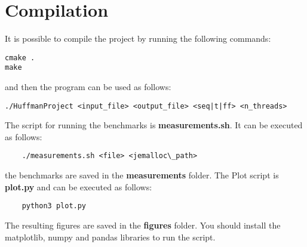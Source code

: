 \documentclass{article}
\begin{document}
\section{Compilation}
It is possible to compile the project by running the following commands:
\begin{verbatim}
cmake .
make
\end{verbatim}
and then the program can be used as follows:
\begin{verbatim}
./HuffmanProject <input_file> <output_file> <seq|t|ff> <n_threads>
\end{verbatim}
The script for running the benchmarks is \textbf{measurements.sh}.
It can be executed as follows:
\begin{verbatim}
    ./measurements.sh <file> <jemalloc\_path>
\end{verbatim}
the benchmarks are saved in the \textbf{measurements} folder.
The Plot script is \textbf{plot.py} and can be executed as follows:
\begin{verbatim}
    python3 plot.py
\end{verbatim}
The resulting figures are saved in the \textbf{figures} folder.
You should install the matplotlib, numpy and pandas libraries to run the script.
\end{document}
